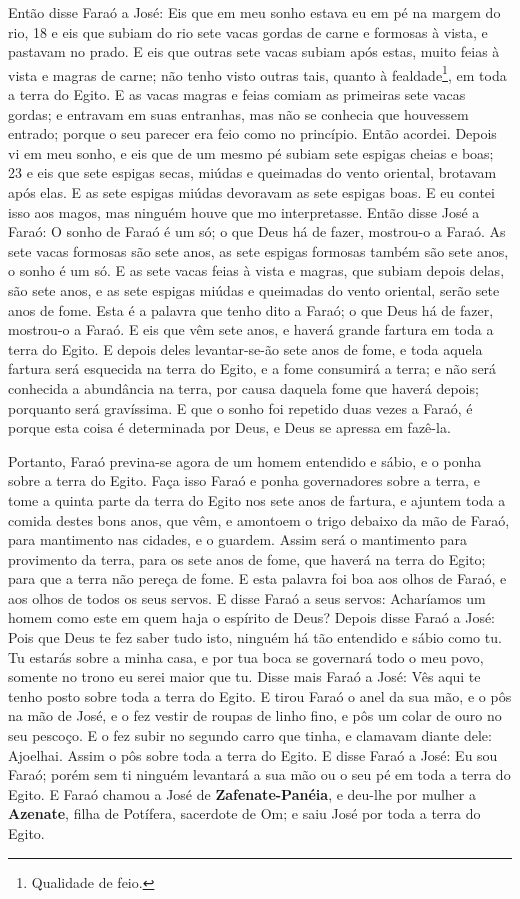 Então disse Faraó a José: Eis que em meu sonho estava eu em pé na
margem do rio, 18 e eis que subiam do rio sete vacas gordas de carne
e formosas à vista, e pastavam no prado. E eis que outras
sete vacas subiam após estas, muito feias à vista e magras de carne;
não tenho visto outras tais, quanto à fealdade\footnote{Qualidade de
feio.}, em toda a terra do Egito. E as vacas magras e feias
comiam as primeiras sete vacas gordas; e entravam em suas
entranhas, mas não se conhecia que houvessem entrado; porque o seu
parecer era feio como no princípio. Então acordei. Depois vi
em meu sonho, e eis que de um mesmo pé subiam sete espigas cheias e
boas; 23 e eis que sete espigas secas, miúdas e queimadas do vento
oriental, brotavam após elas. E as sete espigas miúdas
devoravam as sete espigas boas. E eu contei isso aos magos, mas
ninguém houve que mo interpretasse. Então disse José a Faraó:
O sonho de Faraó é um só; o que Deus há de fazer, mostrou-o a Faraó.
As sete vacas formosas são sete anos, as sete espigas
formosas também são sete anos, o sonho é um só. E as sete
vacas feias à vista e magras, que subiam depois delas, são sete
anos, e as sete espigas miúdas e queimadas do vento oriental, serão
sete anos de fome. Esta é a palavra que tenho dito a Faraó; o
que Deus há de fazer, mostrou-o a Faraó. E eis que vêm sete
anos, e haverá grande fartura em toda a terra do Egito. E
depois deles levantar-se-ão sete anos de fome, e toda aquela fartura
será esquecida na terra do Egito, e a fome consumirá a terra;
e não será conhecida a abundância na terra, por causa daquela
fome que haverá depois; porquanto será gravíssima. E que o
sonho foi repetido duas vezes a Faraó, é porque esta coisa é
determinada por Deus, e Deus se apressa em fazê-la.

Portanto, Faraó previna-se agora de um homem entendido e sábio, e
o ponha sobre a terra do Egito. Faça isso Faraó e ponha
governadores sobre a terra, e tome a quinta parte da terra do Egito
nos sete anos de fartura, e ajuntem toda a comida destes bons
anos, que vêm, e amontoem o trigo debaixo da mão de Faraó, para
mantimento nas cidades, e o guardem. Assim será o mantimento
para provimento da terra, para os sete anos de fome, que haverá na
terra do Egito; para que a terra não pereça de fome. E esta
palavra foi boa aos olhos de Faraó, e aos olhos de todos os seus
servos. E disse Faraó a seus servos: Acharíamos um homem como
este em quem haja o espírito de Deus? Depois disse Faraó a
José: Pois que Deus te fez saber tudo isto, ninguém há tão entendido
e sábio como tu. Tu estarás sobre a minha casa, e por tua
boca se governará todo o meu povo, somente no trono eu serei maior
que tu. Disse mais Faraó a José: Vês aqui te tenho posto
sobre toda a terra do Egito. E tirou Faraó o anel da sua mão,
e o pôs na mão de José, e o fez vestir de roupas de linho fino, e
pôs um colar de ouro no seu pescoço. E o fez subir no segundo
carro que tinha, e clamavam diante dele: Ajoelhai. Assim o pôs sobre
toda a terra do Egito. E disse Faraó a José: Eu sou Faraó;
porém sem ti ninguém levantará a sua mão ou o seu pé em toda a terra
do Egito. E Faraó chamou a José de \textbf{Zafenate-Panéia},
e deu-lhe por mulher a \textbf{Azenate}, filha de Potífera,
sacerdote de Om; e saiu José por toda a terra do Egito.

